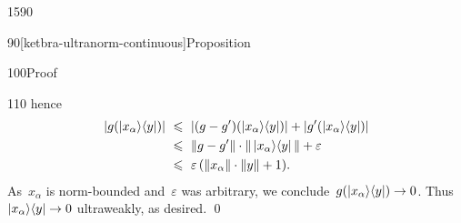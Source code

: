 \begin{parsec}{1590}
\begin{point}{90}[ketbra-ultranorm-continuous]{Proposition}
\begin{point}{100}{Proof}
\begin{point}{110}
    hence
\begin{align*}
        | g(\left|x_\alpha\right>\!\left<y\right|) |
            &\ \leqslant\  | (g-g')(\left|x_\alpha\right>\!\left<y\right|)|  +
                    | g'(\left|x_\alpha\right>\!\left<y\right|) | \\
            &\ \leqslant\  \|g - g'\| \cdot \| \left|x_\alpha\right>\!\left<y\right| \|  + \varepsilon\\
            &\ \leqslant\  \varepsilon \,(\| x_\alpha\| \cdot \|y\| + 1).
\end{align*}
As~$x_\alpha$ is norm-bounded
    and~$\varepsilon$ was arbitrary,
        we conclude~$g(\left|x_\alpha\right>\!\left<y\right|) \to 0$.
    Thus~$\left|x_\alpha\right>\!\left<y\right| \to 0$ ultraweakly, as desired.
    \qed
\end{point}
\end{point}
\end{point}
\end{parsec}

